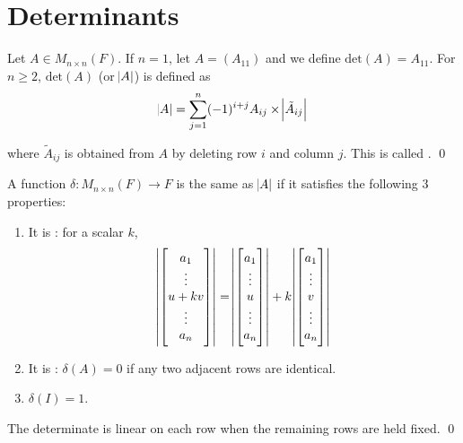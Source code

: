 \section{Determinants}

\begin{definition}
	Let $A \in M_{n \times n} (F)$. If $n =1$, let $A=(A_{11})$ and we define $\text{det}(A) = A_{11}$. For $n \geq 2$, $\text{det}(A)$ (or $\abs{A}$) is defined as
	\begin{equation}
		\abs{A} = \sum_{j=1}^n (-1)^{i + j} A_{ij} \times \abs{\tilde{A}_{ij}}
	\end{equation}
	
	where $\tilde{A}_{ij}$ is obtained from $A$ by deleting row $i$ and column $j$. This is called .
	\qed
\end{definition}


\begin{theorem}
    A function $\delta: M_{n \times n} (F) \rightarrow F$ is the same as $\abs{A}$ if it satisfies the following 3 properties:
    \begin{enumerate}
        \item It is : for a scalar $k$, \begin{equation}
        \abs{\begin{bmatrix}
            a_1\\
            \vdots\\
            u + kv \\
            \vdots\\
            a_n
        \end{bmatrix}} = \abs{\begin{bmatrix}
            a_1\\
            \vdots\\
            u \\
            \vdots\\
            a_n
        \end{bmatrix}} + k \abs{\begin{bmatrix}
            a_1\\
            \vdots\\
            v \\
            \vdots\\
            a_n
        \end{bmatrix}}
    \end{equation}
    \item It is : $\delta(A) = 0$ if any two adjacent rows are identical.
    \item $\delta(I) = 1$.
    \end{enumerate}
    The determinate is linear on each row when the remaining rows are held fixed.
    \qed
\end{theorem}



